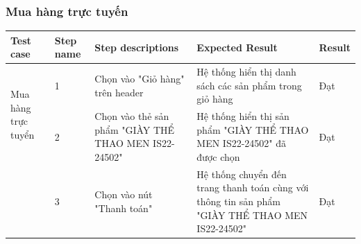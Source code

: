 \subsubsection{Mua hàng trực tuyến}
{
    \setlength\extrarowheight{6pt}
    \begin{longtable}{| p{2.5cm}| p{1cm}| p{5.5cm}| p{4.5cm} | p{1.5cm} |}
        \hline
        \textbf{Test case}                                                                              & \textbf{Step name} & \textbf{Step descriptions} & \textbf{Expected Result} & \textbf{Result} \\
        \hline
        \multirow[t]{2}{2.5cm}{Mua hàng trực tuyển}                                                     &
        1                                                                                               &
        Chọn vào "Giỏ hàng" trên header                                                                 &
        Hệ thống hiển thị danh sách các sản phẩm trong giỏ hàng                                         &
        Đạt                                                                                                                                                                                            \\
        \cline{2-5}
                                                                                                        & 2                  &
        Chọn vào thẻ sản phẩm "GIÀY THỂ THAO MEN IS22-24502"                                            &
        Hệ thống hiển thị sản phẩm "GIÀY THỂ THAO MEN IS22-24502" đã được chọn                          &
        Đạt                                                                                                                                                                                            \\
        \cline{2-5}
                                                                                                        & 3                  &
        Chọn vào nút "Thanh toán"                                                                       &
        Hệ thống chuyển đến trang thanh toán cùng với thông tin sản phẩm "GIÀY THỂ THAO MEN IS22-24502" &
        Đạt                                                                                                                                                                                            \\

\end{longtable}}
